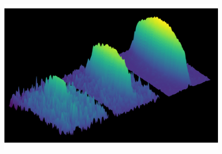 \documentclass{beamer}
\begin{document}
{\begin{frame}{}
  
  
  
\end{frame}


\begin{frame}{}
\begin{center}
    \begin{figure}[h]
        \includegraphics[width=\textwidth]{figures/Intro/BEC.png}
    \end{figure}
\end{center}
\end{frame}
}%
\end{document}
